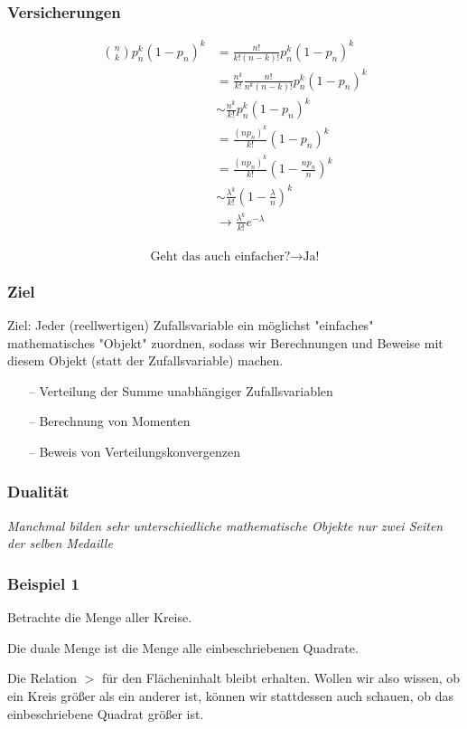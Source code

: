 \documentclass{beamer}
\begin{document}
\begin{frame}
\frametitle{Versicherungen}
{\footnotesize
  \begin{align*}
  {n \choose k} p_n^k(1-p_n)^k &= \frac{n!}{k!(n-k)!} p_n^k(1-p_n)^k\\
  &= \frac{n^k}{k!} \frac{n!}{n^k(n-k)!} p_n^k(1-p_n)^k\\
  &\sim \frac{n^k}{k!} p_n^k(1-p_n)^k\\
  &= \frac{(np_n)^k}{k!}(1-p_n)^k\\
  &= \frac{(np_n)^k}{k!}(1-\frac{np_n}{n})^k\\
  &\sim \frac{\lambda^k}{k!}(1-\frac{\lambda}{n})^k\\
  &\to \frac{\lambda^k}{k!}e^{-\lambda}\\
  \end{align*}
}%
\end{frame}

\begin{frame}
$$\text{Geht das auch einfacher?} \to \text{Ja!}$$
\end{frame}

\begin{frame}
\frametitle{Ziel}
Ziel: Jeder (reellwertigen) Zufallsvariable ein möglichst "einfaches" mathematisches "Objekt" zuordnen, sodass wir Berechnungen und Beweise mit diesem Objekt (statt der Zufallsvariable) machen.
\hfill \newline
\begin{itemize}
    \item[--] Verteilung der Summe unabhängiger Zufallsvariablen
    \item[--] Berechnung von Momenten
    \item[--] Beweis von Verteilungskonvergenzen
\end{itemize}
\end{frame}


\begin{frame}
\frametitle{Dualität}
\textit{Manchmal bilden sehr unterschiedliche mathematische Objekte nur zwei Seiten der selben Medaille}
\end{frame}

\begin{frame}
\frametitle{Beispiel 1}
Betrachte die Menge aller Kreise.

Die duale Menge ist die Menge alle einbeschriebenen Quadrate.

Die Relation $>$ für den Flächeninhalt bleibt erhalten. Wollen wir also wissen, ob ein Kreis größer als ein anderer ist, können wir stattdessen auch schauen, ob das einbeschriebene Quadrat größer ist.
\end{frame}
\end{document}
